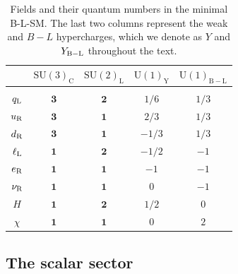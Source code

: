 \documentclass[a4paper,11pt]{article}
\renewcommand{\[}{\left[}
\renewcommand{\]}{\right]}
\newcommand{\U}[1]{\mathrm{U}(1)_{\mathrm{#1}}}			%
\newcommand{\SU}[2]{\mathrm{SU}(#1)_{\mathrm{#2}}}		%
\begin{document}
\begin{table}[htb!]
	\begin{center}
		\begin{tabular}{ccccc}
			& $\SU{3}{C}$ & $\SU{2}{L}$ & $\U{Y}$ & $\U{B-L}$  	\\    
			 \hline \vspace{-2mm} \\
			$q_{\rm L}$     			    							& $\bm{3}$		& $\bm{2}$	&	$1/6$ & $1/3$\vspace{1mm} \\
			$u_{\rm R}$     			    							& $\bm{3}$		& $\bm{1}$	&	$2/3$ & $1/3$\vspace{1mm}	\\
			$d_{\rm R}$     			    							& $\bm{3}$		& $\bm{1}$	&	$-1/3$ & $1/3$\vspace{1mm}\\
			$\ell_{\rm L}$     			    							& $\bm{1}$		& $\bm{2}$	&	$-1/2$ & $-1$\vspace{1mm}\\
			$e_{\rm R}$     			    							& $\bm{1}$		& $\bm{1}$	&	$-1$ & $-1$	\vspace{1mm} \\
			$\nu_{\rm R}$     			    							& $\bm{1}$		& $\bm{1}$	&	$0$ & $-1$ \vspace{1mm}\\
			$H$     			    							& $\bm{1}$		& $\bm{2}$	&	$1/2$ & $0$	\vspace{1mm}\\
			$\chi$     			    							& $\bm{1}$		& $\bm{1}$	&	$0$ & $2$\vspace{1mm}	\\
			\hline
		\end{tabular} 
		\caption{Fields and their quantum numbers in the minimal B-L-SM. The last two columns represent the weak and $B-L$ hypercharges, which we denote as $Y$ and $Y_{\rm B-L}$ throughout the text.}
		\label{tab:charges}  
	\end{center}
\end{table} 
% 

\subsection{The scalar sector}
\end{document}
